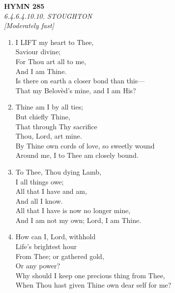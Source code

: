 \newpage
\begin{center}
    {\Large \textbf{HYMN 285}}
    \\
    \textit{6.4.6.4.10.10. STOUGHTON}
    \\
    \textit{\small [Moderately fast]}
\end{center}
\vspace{1em}

\begin{enumerate}
    \item I LIFT my heart to Thee, \\
        Saviour divine; \\
        For Thou art all to me, \\
        And I am Thine. \\
        Is there on earth a closer bond than this--- \\
        That my Belov\`ed's mine, and I am His?

    \item Thine am I by all ties; \\
        But chiefly Thine, \\
        That through Thy sacrifice \\
        Thou, Lord, art mine. \\
        By Thine own cords of love, so sweetly wound \\
        Around me, I to Thee am closely bound.

    \item To Thee, Thou dying Lamb, \\
        I all things owe; \\
        All that I have and am, \\
        And all I know. \\
        All that I have is now no longer mine, \\
        And I am not my own; Lord, I am Thine.

    \item How can I, Lord, withhold \\
        Life's brightest hour \\
        From Thee; or gathered gold, \\
        Or any power? \\
        Why should I keep one precious thing from Thee, \\
        When Thou hast given Thine own dear self for me?

\end{enumerate}

